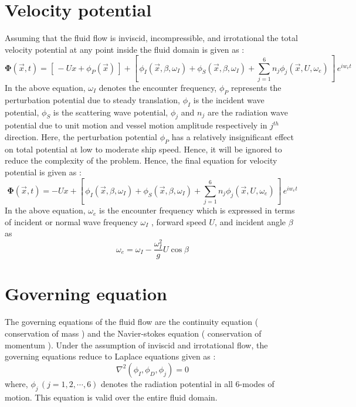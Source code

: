 \section{Velocity potential}
Assuming that the fluid flow is inviscid, incompressible, and irrotational the total velocity potential at any point inside the fluid domain is given as :
\begin{equation}
    \boldsymbol{\Phi} (\vec{x}, t) = [\, -Ux + \phi_P(\vec{x})\,] + [\, \phi_I(\vec{x}, \beta, \omega_I) + \phi_S(\vec{x}, \beta, \omega_I) + \sum_{j=1}^{6}n_j\phi_j(\vec{x}, U, \omega_e) \,]\, e^{i w_e t}
\end{equation}
In the above equation, $\omega_I$ denotes the encounter frequency, $\phi_P$ represents the perturbation potential due to steady translation, $\phi_I$ is the incident wave potential, $\phi_S$ is the scattering wave potential, $\phi_j$ and $n_j$ are the radiation wave potential due to unit motion and vessel motion amplitude respectively in $j^{th}$ direction.
Here, the perturbation potential $\phi_P$ has a relatively insignificant effect on total potential at low to moderate ship speed. Hence, it will be ignored to reduce the complexity of the problem. Hence, the final equation for velocity potential is given as :
\begin{equation}
    \label{eq:velocity_potential}
    \boldsymbol{\Phi} (\vec{x}, t) = -Ux + [\, \phi_I(\vec{x}, \beta, \omega_I) + \phi_S(\vec{x}, \beta, \omega_I) + \sum_{j=1}^{6}n_j\phi_j(\vec{x}, U, \omega_e) \,]\, e^{i w_e t}
\end{equation}
In the above equation, $\omega_e$ is the encounter frequency which is expressed in terms of incident or normal wave frequency $\omega_I$ , forward speed $U$, and incident angle $\beta$ as
\begin{equation}
    \label{eq:omega}
    \omega_e = \omega_I - \frac{\omega_I^2}{g}U\cos\beta
\end{equation}
\section{Governing equation}
The governing equations of the fluid flow are the continuity equation ( conservation of mass ) and the Navier-stokes equation ( conservation of momentum ). Under the assumption of inviscid and irrotational flow, the governing equations reduce to Laplace equations given as :
\begin{equation}
    \label{eq:laplace_eq}
    \nabla^2 (\phi_I, \phi_D, \phi_j) = 0
\end{equation}
where, $\phi_j \, (j = 1,2,\cdots, 6)$ denotes the radiation potential in all 6-modes of motion. This equation is valid over the entire fluid domain.

